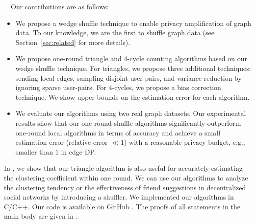 \smallskip
{}~~Our contributions are as follows: 
\begin{itemize}
    \item We propose a wedge shuffle technique to enable privacy amplification 
    of graph data. 
    To our knowledge, we are the first to shuffle graph data (see Section~\ref{sec:related} for more details). 
    \item We propose one-round triangle and 4-cycle counting algorithms 
    based on our wedge shuffle technique. 
    For triangles, we propose three additional techniques: sending local edges, sampling disjoint user-pairs, and variance reduction by ignoring sparse user-pairs. 
    For 4-cycles, we propose a bias correction technique. 
    We show upper bounds on the estimation error for each algorithm. 
    \item We evaluate our algorithms using two real graph datasets. 
    Our experimental results show that our one-round shuffle algorithms 
    significantly outperform one-round local algorithms in terms of accuracy 
    and achieve a small estimation error (relative error $\ll 1$) with a reasonable privacy budget, e.g., smaller than $1$ in edge DP. 
\end{itemize}
In , we show that our triangle algorithm is also useful for accurately estimating the clustering coefficient within one round. 
We can use our algorithms to analyze the clustering tendency or the effectiveness of friend suggestions in decentralized social networks by introducing a shuffler. 
We implemented our algorithms in C/C++. 
Our code is available on GitHub \cite{SubgraphShuffle}. 
The proofs of all statements in the main body are given in . 
